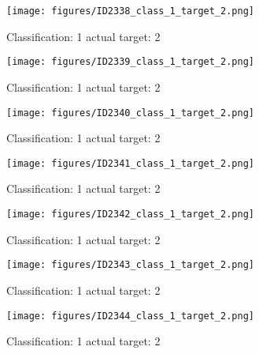 \begin{figure}[h!]
\begin{center}
\texttt{[image: figures/ID2338\_class\_1\_target\_2.png]}
\end{center}
\caption{ Classification: 1 actual target: 2}
\label{fig:ID2338_class_1_target_2}
\end{figure}
\begin{figure}[h!]
\begin{center}
\texttt{[image: figures/ID2339\_class\_1\_target\_2.png]}
\end{center}
\caption{ Classification: 1 actual target: 2}
\label{fig:ID2339_class_1_target_2}
\end{figure}
\begin{figure}[h!]
\begin{center}
\texttt{[image: figures/ID2340\_class\_1\_target\_2.png]}
\end{center}
\caption{ Classification: 1 actual target: 2}
\label{fig:ID2340_class_1_target_2}
\end{figure}
\begin{figure}[h!]
\begin{center}
\texttt{[image: figures/ID2341\_class\_1\_target\_2.png]}
\end{center}
\caption{ Classification: 1 actual target: 2}
\label{fig:ID2341_class_1_target_2}
\end{figure}
\begin{figure}[h!]
\begin{center}
\texttt{[image: figures/ID2342\_class\_1\_target\_2.png]}
\end{center}
\caption{ Classification: 1 actual target: 2}
\label{fig:ID2342_class_1_target_2}
\end{figure}
\begin{figure}[h!]
\begin{center}
\texttt{[image: figures/ID2343\_class\_1\_target\_2.png]}
\end{center}
\caption{ Classification: 1 actual target: 2}
\label{fig:ID2343_class_1_target_2}
\end{figure}
\begin{figure}[h!]
\begin{center}
\texttt{[image: figures/ID2344\_class\_1\_target\_2.png]}
\end{center}
\caption{ Classification: 1 actual target: 2}
\label{fig:ID2344_class_1_target_2}
\end{figure}

